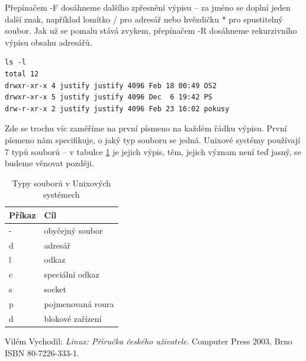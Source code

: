 \documentclass{article}
\begin{document}
Přepínačem -F dosáhneme dalšího zpřesnění výpisu -- za jméno se doplní jeden další znak, například lomítko / pro adresář nebo hvězdičku * pro spustitelný soubor. Jak už se pomalu stává zvykem, přepínačem -R dosáhneme rekurzivního výpisu obsahu adresářů.

\begin{verbatim}
ls -l
total 12
drwxr-xr-x 4 justify justify 4096 Feb 18 00:49 OS2
drwxr-xr-x 5 justify justify 4096 Dec  6 19:42 PS
drw-r-xr-x 2 justify justify 4096 Feb 23 16:02 pokusy
\end{verbatim}
Zde se trochu víc zaměříme na první písmeno na každém řádku výpisu. První písmeno nám specifikuje, o jaký typ souboru se jedná. Unixové systémy používají 7 typů souborů -- v tabulce \ref{tabfiles} je jejich výpis, těm, jejich význam není teď jasný, se budeme věnovat později.

\begin{table}
\begin{center}
\begin{tabular}{l | l}
Příkaz & Cíl\\
\hline
- & obyčejný soubor\\
d & adresář\\
l & odkaz\\
c & speciální odkaz\\
s & socket\\
p & pojmenovaná roura\\
d & blokové zařízení\\
\end{tabular}
\end{center}
\caption{Typy souborů v Unixových systémech}
\label{tabfiles}
\end{table}




\begin{thebibliography}{0}
  Vilém Vychodil: \emph{Linux: Příručka českého uživatele}. Computer Press 2003, Brno ISBN 80-7226-333-1.   
\end{thebibliography}
\end{document}
